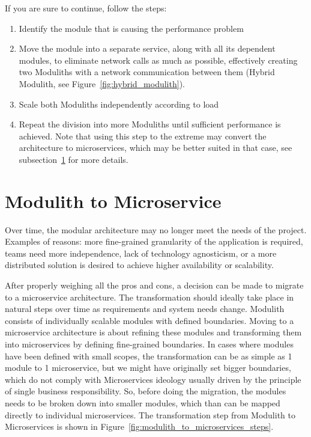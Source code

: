 If you are sure to continue, follow the steps:
\begin{enumerate}
    \item Identify the module that is causing the performance problem
    \item Move the module into a separate service, along with all its dependent modules, to eliminate network calls as much as possible, effectively creating two Moduliths with a network communication between them (Hybrid Modulith, see Figure~\ref{fig:hybrid_modulith}).
    \item Scale both Moduliths independently according to load
    \item Repeat the division into more Moduliths until sufficient performance is achieved. Note that using this step to the extreme may convert the architecture to microservices, which may be better suited in that case, see subsection~\ref{subsection:modulith_to_microservices} for more details.
\end{enumerate}


\section{Modulith to Microservice}
\label{subsection:modulith_to_microservices}
Over time, the modular architecture may no longer meet the needs of the project. Examples of reasons: more fine-grained granularity of the application is required, teams need more independence, lack of technology agnosticism, or a more distributed solution is desired to achieve higher availability or scalability.

After properly weighing all the pros and cons, a decision can be made to migrate to a microservice architecture. The transformation should ideally take place in natural steps over time as requirements and system needs change. Modulith consists of individually scalable modules with defined boundaries. Moving to a microservice architecture is about refining these modules and transforming them into microservices by defining fine-grained boundaries. In cases where modules have been defined with small scopes, the transformation can be as simple as 1 module to 1 microservice, but we might have originally set bigger boundaries, which do not comply with Microservices ideology usually driven by the principle of single business responsibility. So, before doing the migration, the modules needs to be broken down into smaller modules, which than can be mapped directly to individual microservices. The transformation step from Modulith to Microservices is shown in Figure~\ref{fig:modulith_to_microservices_steps}.

